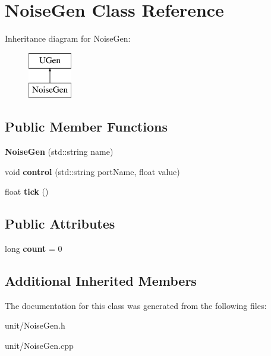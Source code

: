 \hypertarget{classNoiseGen}{}\section{Noise\+Gen Class Reference}
\label{classNoiseGen}
Inheritance diagram for Noise\+Gen\+:\begin{figure}[H]
\begin{center}
\leavevmode
\includegraphics[height=2.000000cm]{classNoiseGen}
\end{center}
\end{figure}
\subsection*{Public Member Functions}
\begin{DoxyCompactItemize}
\item 
{\bfseries Noise\+Gen} (std\+::string name)\hypertarget{classNoiseGen_aa49d8817fff2757abc19f0dffea0c7fe}{}\label{classNoiseGen_aa49d8817fff2757abc19f0dffea0c7fe}

\item 
void {\bfseries control} (std\+::string port\+Name, float value)\hypertarget{classNoiseGen_a73628ae13d893658b88bc30eb43437ba}{}\label{classNoiseGen_a73628ae13d893658b88bc30eb43437ba}

\item 
float {\bfseries tick} ()\hypertarget{classNoiseGen_addaecf96df1cf9f1ba4875fb849949df}{}\label{classNoiseGen_addaecf96df1cf9f1ba4875fb849949df}

\end{DoxyCompactItemize}
\subsection*{Public Attributes}
\begin{DoxyCompactItemize}
\item 
long {\bfseries count} = 0\hypertarget{classNoiseGen_ae4bcbe827651898095ca99644663a05e}{}\label{classNoiseGen_ae4bcbe827651898095ca99644663a05e}

\end{DoxyCompactItemize}
\subsection*{Additional Inherited Members}


The documentation for this class was generated from the following files\+:\begin{DoxyCompactItemize}
\item 
unit/Noise\+Gen.\+h\item 
unit/Noise\+Gen.\+cpp\end{DoxyCompactItemize}
